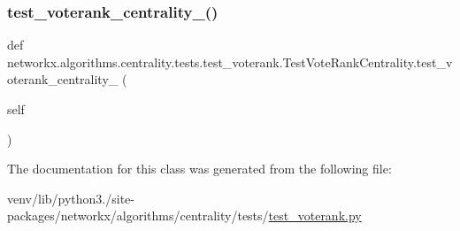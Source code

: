 \subsubsection{\texorpdfstring{test\+\_\+voterank\+\_\+centrality\+\_()}{test\_voterank\_centrality\_5()}}
{\footnotesize\ttfamily def networkx.\+algorithms.\+centrality.\+tests.\+test\+\_\+voterank.\+Test\+Vote\+Rank\+Centrality.\+test\+\_\+voterank\+\_\+centrality\+\_ (\begin{DoxyParamCaption}\item[{}]{self }\end{DoxyParamCaption})}



The documentation for this class was generated from the following file\+:\begin{DoxyCompactItemize}
\item 
venv/lib/python3./site-\/packages/networkx/algorithms/centrality/tests/\hyperlink{test__voterank_8py}{test\+\_\+voterank.\+py}\end{DoxyCompactItemize}
